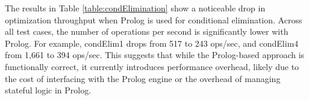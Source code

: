 The results in Table \ref{table:condElimination} show a noticeable drop in optimization throughput when Prolog is used for conditional elimination. Across all test cases, the number of operations per second is significantly lower with Prolog. For example, condElim1 drops from 517 to 243 ops/sec, and condElim4 from 1,661 to 394 ops/sec. This suggests that while the Prolog-based approach is functionally correct, it currently introduces performance overhead, likely due to the cost of interfacing with the Prolog engine or the overhead of managing stateful logic in Prolog.
